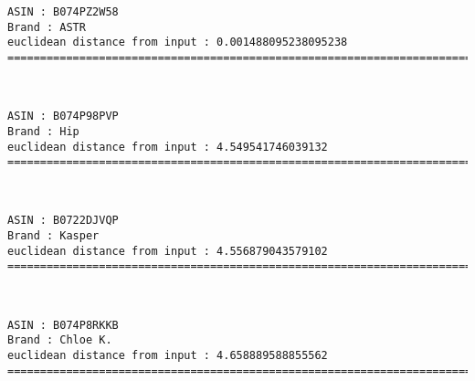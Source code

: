 \documentclass[11pt]{article}
\begin{document}
    \begin{Verbatim}[commandchars=\\\{\}]
ASIN : B074PZ2W58
Brand : ASTR
euclidean distance from input : 0.001488095238095238
=============================================================================================================================

    \end{Verbatim}

    
    
    \begin{center}
    \end{center}
    { \hspace*{\fill} \\}
    
    \begin{Verbatim}[commandchars=\\\{\}]
ASIN : B074P98PVP
Brand : Hip
euclidean distance from input : 4.549541746039132
=============================================================================================================================

    \end{Verbatim}

    
    
    \begin{center}
    \end{center}
    { \hspace*{\fill} \\}
    
    \begin{Verbatim}[commandchars=\\\{\}]
ASIN : B0722DJVQP
Brand : Kasper
euclidean distance from input : 4.556879043579102
=============================================================================================================================

    \end{Verbatim}

    
    
    \begin{center}
    \end{center}
    { \hspace*{\fill} \\}
    
    \begin{Verbatim}[commandchars=\\\{\}]
ASIN : B074P8RKKB
Brand : Chloe K.
euclidean distance from input : 4.658889588855562
=============================================================================================================================

    \end{Verbatim}
\end{document}
